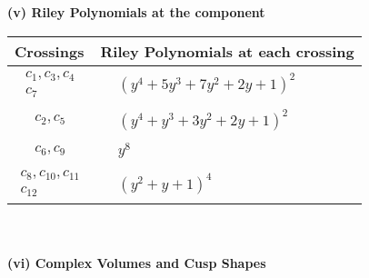 \documentclass[1p]{elsarticle_modified}
\theoremstyle{definition}
\begin{document}
\newpage\renewcommand{\arraystretch}{1}
\flushleft \textbf{(v) Riley Polynomials at the component}\newline \\
\begin{tabular}{m{50pt}|m{274pt}}
Crossings & \hspace{64pt}Riley Polynomials at each crossing \\
\hline $$\begin{aligned}c_{1},c_{3},c_{4}\\c_{7}\end{aligned}$$&$\begin{aligned}
&(y^4+5 y^3+7 y^2+2 y+1)^2
\end{aligned}$\\
\hline $$\begin{aligned}c_{2},c_{5}\end{aligned}$$&$\begin{aligned}
&(y^4+y^3+3 y^2+2 y+1)^2
\end{aligned}$\\
\hline $$\begin{aligned}c_{6},c_{9}\end{aligned}$$&$\begin{aligned}
&y^8
\end{aligned}$\\
\hline $$\begin{aligned}c_{8},c_{10},c_{11}\\c_{12}\end{aligned}$$&$\begin{aligned}
&(y^2+y+1)^4
\end{aligned}$\\
\hline
\end{tabular}\\~\\
\newpage\flushleft \textbf{(vi) Complex Volumes and Cusp Shapes}
\end{document}
